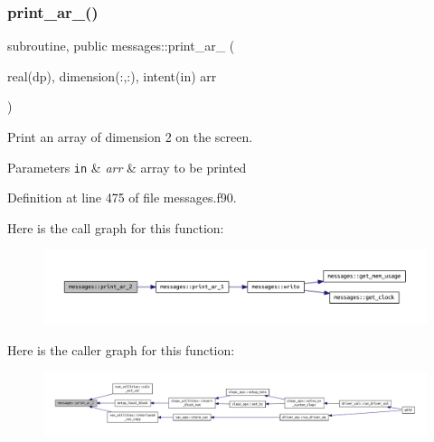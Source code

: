 \subsubsection{\texorpdfstring{print\+\_\+ar\+\_()}{print\_ar\_2()}}
{\footnotesize\ttfamily subroutine, public messages\+::print\+\_\+ar\+\_ (\begin{DoxyParamCaption}\item[{real(dp), dimension(\+:,\+:), intent(in)}]{arr }\end{DoxyParamCaption})}



Print an array of dimension 2 on the screen. 


\begin{DoxyParams}[1]{Parameters}
\mbox{\tt in}  & {\em arr} & array to be printed \\
\hline
\end{DoxyParams}


Definition at line 475 of file messages.\+f90.

Here is the call graph for this function\+:\nopagebreak
\begin{figure}[H]
\begin{center}
\leavevmode
\includegraphics[width=350pt]{namespacemessages_a80797cedef6112b8dccaeda431f0c610_cgraph}
\end{center}
\end{figure}
Here is the caller graph for this function\+:\nopagebreak
\begin{figure}[H]
\begin{center}
\leavevmode
\includegraphics[width=350pt]{namespacemessages_a80797cedef6112b8dccaeda431f0c610_icgraph}
\end{center}
\end{figure}
\mbox{\label{namespacemessages_a0da9248828de8b7480b99b47618e8310}} 
